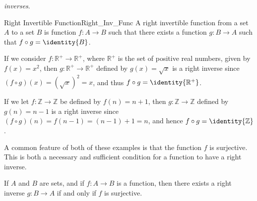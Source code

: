         \textit{inverses}.
        \begin{fdefinition}{Right Invertible Function}{Right_Inv_Func}
            A right invertible function from a set $A$ to a set $B$ is function
            $f:A\rightarrow{B}$ such that there exists a function
            $g:B\rightarrow{A}$ such that $f\circ{g}=\identity{B}$.
        \end{fdefinition}
        \begin{example}
            If we consider $f:\mathbb{R}^{+}\rightarrow\mathbb{R}^{+}$, where
            $\mathbb{R}^{+}$ is the set of positive real numbers, given by
            $f(x)=x^{2}$, then $g:\mathbb{R}^{+}\rightarrow\mathbb{R}^{+}$
            defined by $g(x)=\sqrt{x}$ is a right inverse since
            $(f\circ{g})(x)=(\sqrt{x})^{2}=x$, and thus
            $f\circ{g}=\identity{\mathbb{R}^{+}}$.
        \end{example}
        \begin{example}
            If we let $f:\mathbb{Z}\rightarrow\mathbb{Z}$ be defined by
            $f(n)=n+1$, then $g:\mathbb{Z}\rightarrow\mathbb{Z}$ defined by
            $g(n)=n-1$ is a right inverse since
            $(f\circ{g})(n)=f(n-1)=(n-1)+1=n$, and hence
            $f\circ{g}=\identity{\mathbb{Z}}$.
        \end{example}
        A common feature of both of these examples is that the function $f$ is
        surjective. This is both a necessary and sufficient condition for a
        function to have a right inverse.
        \begin{theorem}
            \label{thm:Right_Inv_iff_Surj}%
            If $A$ and $B$ are sets, and if $f:A\rightarrow{B}$ is a function,
            then there exists a right inverse $g:B\rightarrow{A}$ if and only
            if $f$ is surjective.
        \end{theorem}
